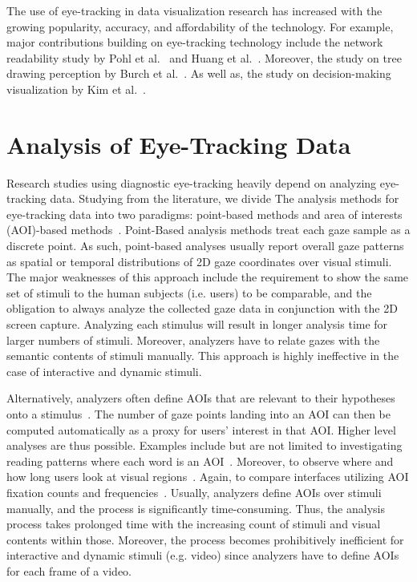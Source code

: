 The use of eye-tracking in data visualization research has increased with the growing popularity, accuracy, and affordability of the technology. For example, major contributions building on eye-tracking technology include the network readability study by Pohl et al.~\cite{Poh09} and Huang et al.~\cite{Hua08, Hua05}. Moreover, the study on tree drawing perception by Burch et al.~\cite{Bur11, Bur13}. As well as, the study on decision-making visualization by Kim et al.~\cite{Kim12}.

\section{Analysis of Eye-Tracking Data}
Research studies using diagnostic eye-tracking heavily depend on analyzing eye-tracking data. Studying from the literature, we divide The analysis methods for eye-tracking data into two paradigms: point-based methods and area of interests (AOI)-based methods~\cite{Bla14}. Point-Based analysis methods treat each gaze sample as a discrete point. As such, point-based analyses usually report overall gaze patterns as spatial or temporal distributions of 2D gaze coordinates over visual stimuli. The major weaknesses of this approach include the requirement to show the same set of stimuli to the human subjects (i.e. users) to be comparable, and the obligation to always analyze the collected gaze data in conjunction with the 2D screen capture. Analyzing each stimulus will result in longer analysis time for larger numbers of stimuli. Moreover, analyzers have to relate gazes with the semantic contents of stimuli manually. This approach is highly ineffective in the case of interactive and dynamic stimuli.

Alternatively, analyzers often define AOIs that are relevant to their hypotheses onto a stimulus~\cite{Bla14}. The number of gaze points landing into an AOI can then be computed automatically as a proxy for users' interest in that AOI. Higher level analyses are thus possible. Examples include but are not limited to investigating reading patterns where each word is an AOI~\cite{Bey05, San04}. Moreover, to observe where and how long users look at visual regions~\cite{Coco09, Kim12}. Again, to compare interfaces utilizing AOI fixation counts and frequencies~\cite{Coletkin09}. Usually, analyzers define AOIs over stimuli manually, and the process is significantly time-consuming. Thus, the analysis process takes prolonged time with the increasing count of stimuli and visual contents within those. Moreover, the process becomes prohibitively inefficient for interactive and dynamic stimuli (e.g. video) since analyzers have to define AOIs for each frame of a video.    
  
